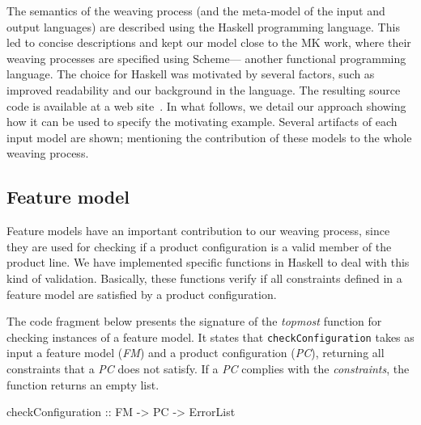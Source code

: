 \newpage

The semantics of the weaving process (and the
meta-model of the input and output languages) are described using the Haskell
programming language. This led to concise descriptions and kept our model close
to the MK work, where their weaving processes are specified using Scheme---
another functional programming language. The choice for Haskell was motivated by
several factors, such as improved readability and our background in the language.
The resulting source code is available at a web site~\cite{SPG:site}. In what follows, we detail our approach showing
how it can be used to specify the motivating example. Several artifacts of each
input model are shown; mentioning the contribution of these models to the whole
weaving process.




\subsection{Feature model}

Feature models have an important contribution to our weaving process, since they
are used for checking if a product configuration is a valid member of the product
line. We have implemented specific functions in Haskell to deal with
this kind of validation. Basically, these functions verify if all constraints defined in
a feature model are satisfied by a product configuration. 

The code fragment below presents the signature of the \emph{topmost} function
for checking instances of a feature model. It states that
\texttt{checkConfiguration} takes as input a feature model (\emph{FM}) and a
product configuration (\emph{PC}), returning all constraints that a
\emph{PC} does not satisfy. If a \emph{PC} complies with the \emph{constraints}, the
function returns an empty list.

\begin{code}
checkConfiguration :: FM -> PC -> ErrorList
\end{code}

